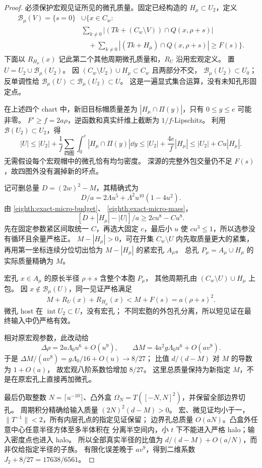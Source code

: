\begin{proof}
必须保护宏观见证所见的微孔质量。固定已经构造的
\(H_\mu\subset U_2\)，定义
\[
 \begin{aligned}
 \mathcal B_\mu(V)=\{s=0\}&\cup\biggl\{x\in C_w:\\
 &\sum_{k\ne0}|(Tk+(C_w\setminus V))\cap Q(x,\rho+s)|\\
 &\quad+\sum_{k\ne0}|(Tk+H_\mu)\cap Q(x,\rho+s)|\ge F(s)\biggr\}.
 \end{aligned}
\]
下面以 \(R_{H_\mu}(x)\) 记此第二个其他周期微孔质量和，\(R_U\) 沿用宏观定义。
置 \(U=U_2\cup\mathcal B_\mu(U_2)\)。
因 \((C_w\setminus U_2)\cup H_\mu\subset C_w\) 且两部分不交，
\(\mathcal B_\mu(U_2)\subset U_0\)；
反单调性给 \(\mathcal B_\mu(U)\subset\mathcal B_\mu(U_2)\subset U\)。
这是一遍显式集合运算，没有未知孔形固定点。

在上述四个 chart 中，新旧目标帽质量差为
\(|H_\mu\cap\Pi(y)|\)，只有 \(0\le y\le e\) 可能非零。
\(F'\ge f=2a\rho\)，逆函数和真实纤维上截断为 \(1/f\)-Lipschitz。
利用 \(\mathcal B(U_2)\subset U_2\)，得
\[
 |U|\le|U_2|+\frac1f\sum_{\text{四图}}\int_0^e
                         |H_\mu\cap\Pi(y)|\dd y
 \le|U_2|+\frac{4e}{f}|H_\mu|
 \le|U_2|+Cu|H_\mu|.
\]
无需假设每个宏观帽中的微孔恰有均匀密度。
深源的完整外包交量仍不足 \(F(s)\)，故四图外没有漏掉新的坏点。

记可删总量 \(D=(2w)^2-M\)，其精确式为
\[
 D/a=2\Lambda u^5+\Lambda^2u^{10}(1-4u^2).
\]
由 \eqref{eighth:exact-micro-budget}、
\eqref{eighth:exact-micro-mass}，
\[
 [D+|H_\mu|-|U|]/a\ge2cu^8-Cu^8.
\]
先在固定参数紧区间取统一 \(C\)，再选大固定 \(c\)，最后小 \(u\)
使 \(cu^3\le1\)，所以选参没有循环且余量严格正。
\(M-|H_\mu|>0\)，可在开集 \(C_w\setminus U\) 内先取质量更大的紧集，
再用第一坐标连续分位切出恰为 \(M-|H_\mu|\) 的紧宏孔 \(A_\mu\)。
总孔 \(P_\mu=A_\mu\cup H_\mu\) 的实际质量精确为 \(M\)。

宏孔 \(x\in A_\mu\) 的原长半径 \(\rho+s\) 含整个本胞 \(P_\mu\)，
其他周期孔由 \((C_w\setminus U)\cup H_\mu\) 上包。
因 \(x\notin\mathcal B_\mu(U)\)，同一见证严格满足
\[
 M+R_U(x)+R_{H_\mu}(x)<M+F(s)=a(\rho+s)^2.
\]
微孔 host 在 \(\operatorname{int}U_2\subset U\)，没有宏孔；
不同宏胞的外包孔分离，所以短见证在最终输入中仍严格有效。

相对原宏观参数，此改动给
\[
 \Delta\rho=2a\Lambda_0u^6+O(u^9),\qquad
 \Delta M=4a^2g\Lambda_0u^6+O(av^9).
\]
于是 \(\Delta M/(av^8)=g\Lambda_0/16+O(u)\to8/27\)；
比值 \(d/(d-M)\) 对 \(M\) 的导数为 \(1+O(a)\)，
故宏观八阶系数恰增加 \(8/27\)。
这里总质量保持为新指定 \(M\)，不是在原宏孔上直接再加微孔。

最后仍取整数 \(N=\lceil u^{-10}\rceil\)、凸外盒
\(\Omega_N=T([-N,N]^2)\)，并保留全部边界切孔。
周期积分精确给输入质量 \((2N)^2(d-M)>0\)。
宏、微见证均小于一，\(\|T^{-1}\|<2\)，所有内层孔点的指定见证保留；
边界孔总质量 \(O(aN)\)。凸盒外任意中心任意半径方体至多半体积在
分离半空间内，小 \(t\) 下不能进入严格 halo；输入密度点也进入 halo。
所以全部真实半径的比值为 \(d/(d-M)+O(a/N)\)，而非仅给指定半径的子族。
有限化误差晚于 \(av^9\)，得到二维系数
\(J_2+8/27=17638/6561\)。
\end{proof}
